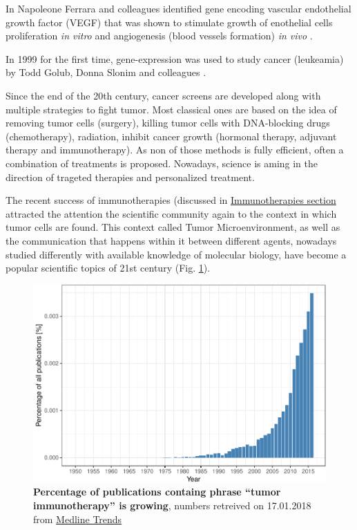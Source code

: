 \documentclass[12pt,]{book}
\theoremstyle{definition}
\theoremstyle{definition}
\theoremstyle{definition}
\theoremstyle{remark}
\begin{document}
In Napoleone Ferrara and colleagues identified gene encoding vascular
endothelial growth factor (VEGF) that was shown to stimulate growth of
enothelial cells proliferation \emph{in vitro} and angiogenesis (blood
vessels formation) \emph{in vivo} \citep{Leung1989}.

In 1999 for the first time, gene-expression was used to study cancer
(leukeamia) by Todd Golub, Donna Slonim and colleagues
\citep{Golub1999}.

Since the end of the 20th century, cancer screens are developed along
with multiple strategies to fight tumor. Most classical ones are based
on the idea of removing tumor cells (surgery), killing tumor cells with
DNA-blocking drugs (chemotherapy), radiation, inhibit cancer growth
(hormonal therapy, adjuvant therapy and immunotherapy). As non of those
methods is fully efficient, often a combination of treatments is
proposed. Nowadays, science is aming in the direction of trageted
therapies and personalized treatment.

The recent success of immunotherapies (discussed in
\protect\hyperlink{immunotherapies}{Immunotherapies section} attracted
the attention the scientific community again to the context in which
tumor cells are found. This context called Tumor Microenvironment, as
well as the communication that happens within it between different
agents, nowadays studied differently with available knowledge of
molecular biology, have become a popular scientific topics of 21st
century (Fig. \ref{fig:pubmedTME}).

\begin{figure}

{\centering \includegraphics[width=0.7\linewidth]{UCzPhDThesis_files/figure-latex/pubmedTME-1} 

}

\caption[Percentage of publications containg phrase "tumor immunotherapy" is growing]{\textbf{Percentage of publications containg
phrase ``tumor immunotherapy'' is growing}, numbers retreived on
17.01.2018 from \href{http://dan.corlan.net/medline-trend.html}{Medline
Trends} \citep{Corlan2004}}\label{fig:pubmedTME}
\end{figure}
\end{document}
